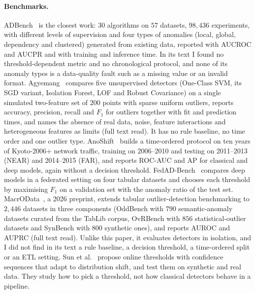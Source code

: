 \documentclass[conference]{IEEEtran}
\begin{document}
\paragraph{Benchmarks.}
ADBench~\cite{han2022adbench} is the closest work: $30$ algorithms on $57$
datasets, $98{,}436$ experiments, with different levels of supervision and four
types of anomalies (local, global, dependency and clustered) generated from
existing data, reported with AUCROC and AUCPR and with training and inference
time. In its text I found no threshold-dependent metric and no chronological
protocol, and none of its anomaly types is a data-quality fault such as a
missing value or an invalid format. Agyemang~\cite{agyemang2024anomaly}
compares five unsupervised detectors (One-Class SVM, its SGD variant, Isolation Forest, LOF and Robust
Covariance) on a single simulated two-feature set of $200$ points with sparse uniform outliers, reports accuracy,
precision, recall and $F_1$ for outliers together with fit and prediction times, and names the absence of real data,
noise, feature interactions and heterogeneous features as limits (full text read). It has no rule baseline, no time order and one
outlier type. AnoShift~\cite{dragoi2022anoshift} builds a time-ordered
protocol on ten years of Kyoto-2006+ network traffic, training on 2006--2010 and
testing on 2011--2013 (NEAR) and 2014--2015 (FAR), and reports ROC-AUC and AP
for classical and deep models, again without a decision threshold.
FedAD-Bench~\cite{anwar2024fedadbench} compares deep models in a federated
setting on four tabular datasets and chooses each threshold by maximising $F_1$
on a validation set with the anomaly ratio of the test set. MacrOData~\cite{ding2026macrodata}, a 2026 preprint, extends tabular
outlier-detection benchmarking to $2{,}446$ datasets in three components
(OddBench with $790$ semantic-anomaly datasets curated from the TabLib corpus,
OvRBench with $856$ statistical-outlier datasets and SynBench with $800$
synthetic ones), and reports AUROC and AUPRC (full text read). Unlike this paper, it evaluates detectors in isolation, and I did not find
in its text a rule baseline, a decision threshold, a time-ordered split or
an ETL setting. Sun et
al.~\cite{sun2024online} propose online thresholds with confidence sequences
that adapt to distribution shift, and test them on synthetic and real data. They
study how to pick a threshold, not how classical detectors behave in a pipeline.
\end{document}
